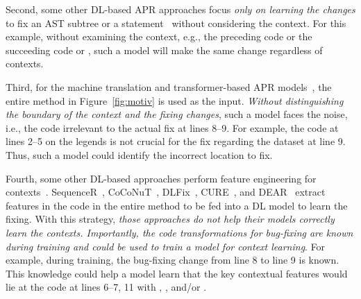 Second, some other DL-based APR approaches focus {\em only
  on learning the changes} to fix an AST subtree or a
statement~\cite{chakrabortycodit,see2017get} without considering the
context. For this example, without examining the context,
e.g., the preceding code  or the succeeding code
 or ,
such a model will make the same change regardless of contexts.



Third, for the machine translation and transformer-based APR
models~\cite{hata2018learning,tufano2019learning,tufano2018empirical},
the entire method in Figure~\ref{fig:motiv} is used as the input. {\em
  Without distinguishing the boundary of the context and the fixing
  changes}, such a model faces the noise, i.e., the code irrelevant to
the actual fix at lines 8--9. For example, the code at lines 2--5 on
the legends is not crucial for the fix regarding the dataset at line
9. Thus, such a model could identify the incorrect location to fix.





Fourth, some other DL-based approaches perform feature engineering for
contexts~\cite{chen2018sequencer,cure-icse21,lutellier2020coconut,icse20,icse22}.
SequenceR~\cite{chen2018sequencer},
CoCoNuT~\cite{lutellier2020coconut}, DLFix~\cite{icse20},
CURE~\cite{cure-icse21}, and DEAR~\cite{icse22} extract features in
the code in the entire method to be fed into a DL model to
learn the fixing. With this strategy, {\em those approaches do not
  help their models correctly learn the contexts. Importantly, the code
  transformations for bug-fixing are known during training and could
  be used to train a model for context learning}. For example,
during training, the bug-fixing change from line 8 to line 9 is
known. This knowledge could help a model learn that the key contextual
features would lie at the code at lines 6--7, 11 with ,
, and/or .


